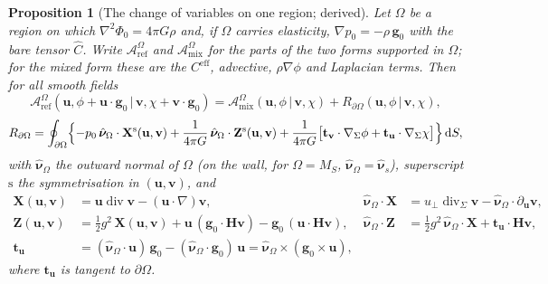 \documentclass[11pt]{article}
\newtheorem{proposition}{Proposition}
\theoremstyle{definition}
\theoremstyle{remark}
\newcommand{\bu}{\mathbf{u}}
\newcommand{\bv}{\mathbf{v}}
\newcommand{\dS}{\,\mathrm{d}S}
\newcommand{\Div}{\operatorname{div}}
\newcommand{\nuhs}{\hat{\boldsymbol{\nu}}_s}
\newcommand{\nuho}{\hat{\boldsymbol{\nu}}_\Omega}
\begin{document}
\begin{proposition}[The change of variables on one region; derived]
\label{prop:seam}
Let $\Omega$ be a region on which $\nabla^2\Phi_0 = 4\pi G\rho$ and,
if $\Omega$ carries elasticity, $\nabla p_0 = -\rho\,\mathbf g_0$ with
the bare tensor $\hat C$. Write $\mathcal A^\Omega_{\mathrm{ref}}$ and
$\mathcal A^\Omega_{\mathrm{mix}}$ for the parts of the two forms
supported in $\Omega$; for the mixed form these are the
$C^{\mathrm{eff}}$, advective, $\rho\nabla\phi$ and Laplacian terms.
Then for all smooth fields
\begin{equation}
  \mathcal A^\Omega_{\mathrm{ref}}(\bu, \phi + \bu\cdot\mathbf g_0
  \,|\, \bv, \chi + \bv\cdot\mathbf g_0)
  = \mathcal A^\Omega_{\mathrm{mix}}(\bu, \phi \,|\, \bv, \chi)
  + R_{\partial\Omega}(\bu, \phi \,|\, \bv, \chi),
  \label{eq:seam-identity}
\end{equation}
\begin{equation*}
  R_{\partial\Omega} = \oint_{\partial\Omega}\Bigl\{
  -p_0\,\nuho\cdot\mathbf X^{\mathrm s}(\bu, \bv)
  + \frac{1}{4\pi G}\,\nuho\cdot\mathbf Z^{\mathrm s}(\bu, \bv)
  + \frac{1}{4\pi G}\bigl[\mathbf t_{\bv}\cdot\nabla_\Sigma\phi
  + \mathbf t_{\bu}\cdot\nabla_\Sigma\chi\bigr]\Bigr\}\dS ,
\end{equation*}
with $\nuho$ the outward normal of $\Omega$ (on the wall, for
$\Omega = M_S$, $\nuho = \nuhs$), superscript
$\mathrm s$ the symmetrisation in $(\bu, \bv)$, and
\begin{align*}
  \mathbf X(\bu, \bv) &= \bu\Div\bv - (\bu\cdot\nabla)\bv,
  &\nuho\cdot\mathbf X &= u_\perp\Div_\Sigma\bv
     - \nuho\cdot\partial_{\bu}\bv,\\
  \mathbf Z(\bu, \bv) &= \tfrac12 g^2\,\mathbf X(\bu, \bv)
     + \bu\,(\mathbf g_0\cdot\mathbf H\bv)
     - \mathbf g_0\,(\bu\cdot\mathbf H\bv),
  &\nuho\cdot\mathbf Z &= \tfrac12 g^2\,\nuho\cdot\mathbf X
     + \mathbf t_{\bu}\cdot\mathbf H\bv,\\
  \mathbf t_{\bu} &= (\nuho\cdot\bu)\,\mathbf g_0
     - (\nuho\cdot\mathbf g_0)\,\bu
     = \nuho\times(\mathbf g_0\times\bu) ,
\end{align*}
where $\mathbf t_{\bu}$ is tangent to $\partial\Omega$.
\end{proposition}
\end{document}
